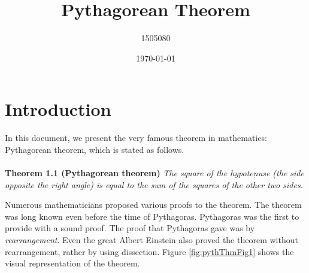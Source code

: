 \documentclass{article}
\title{Pythagorean Theorem}
\author{1505080}
\date{\today}
\begin{document}
\maketitle

\section{Introduction}
    In this document, we present the very famous theorem in mathematics: Pythagorean theorem, which is stated as follows.\\
    \\
    \textbf{Theorem 1.1 (Pythagorean theorem) } \textit{The square of the hypotenuse (the side opposite the right angle) is equal to the sum of the squares of the other two sides.} \\
    \par
    Numerous mathematicians proposed various proofs to the theorem. The theorem was long known even before the time of Pythagoras. Pythagoras was the first to provide with a sound proof. The proof that Pythagoras gave was by \textit{rearrangement}. Even the great Albert Einstein also proved the theorem without rearrangement, rather by using dissection. Figure \ref{fig:pythThmFig1} shows the visual representation of the theorem.
\end{document}
